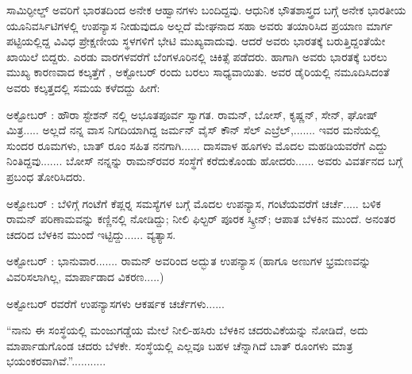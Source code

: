 ಸಾಮಿರ್‍ಫೀಲ್ಡ್ ಅವರಿಗೆ ಭಾರತದಿಂದ ಅನೇಕ ಆಹ್ವಾನಗಳು ಬಂದಿದ್ದವು. ಆಧುನಿಕ ಭೌತಶಾಸ್ತ್ರದ ಬಗ್ಗೆ ಅನೇಕ ಭಾರತೀಯ ಯೂನಿವರ್ಸಿಟಿಗಳಲ್ಲಿ ಉಪನ್ಯಾಸ ನೀಡುವುದೂ ಅಲ್ಲದೆ ಮೇಘನಾದ ಸಹಾ ಅವರು ತಯಾರಿಸಿದ ಪ್ರಯಾಣ ಮಾರ್ಗ ಪಟ್ಟಿಯಲ್ಲಿದ್ದ ವಿವಿಧ ಪ್ರೇಕ್ಷಣೀಯ ಸ್ಥಳಗಳಿಗೆ ಭೇಟಿ ಮುಖ್ಯವಾದುವು. ಆದರೆ ಅವರು ಭಾರತಕ್ಕೆ ಬರುತ್ತಿದ್ದಂತೆಯೇ ಖಾಯಿಲೆ ಬಿದ್ದರು. ಎರಡು ವಾರಗಳವರೆಗೆ ಬೆಂಗಳೂರಿನಲ್ಲಿ ಚಿಕಿತ್ಸೆ ಪಡೆದರು. ಹಾಗಾಗಿ ಅವರು ಭಾರತಕ್ಕೆ ಬರಲು ಮುಖ್ಯ ಕಾರಣವಾದ ಕಲ್ಕತ್ತೆಗೆ , ಅಕ್ಟೋಬರ್ ರಂದು ಬರಲು ಸಾಧ್ಯವಾಯಿತು. ಅವರ ಡೈರಿಯಲ್ಲಿ ನಮೂದಿಸಿದಂತೆ ಅವರು ಕಲ್ಕತ್ತದಲ್ಲಿ ಸಮಯ ಕಳೆದದ್ದು ಹೀಗೆ:

ಅಕ್ಟೋಬರ್ : ಹೌರಾ ಸ್ಟೇಶನ್ ನಲ್ಲಿ ಅಭೂತಪೂರ್ವ ಸ್ವಾಗತ. ರಾಮನ್, ಬೋಸ್, ಕೃಷ್ಣನ್, ಸೇನ್, ಘೋಷ್ ಮಿತ್ರ..... ಅಲ್ಲದೆ ನನ್ನ ವಾಸ ನಿಗದಿಯಾಗಿದ್ದ ಜರ್ಮನ್ ವೈಸ್ ಕೌನ್ ಸೆಲ್ ಎಬ್ರೆಲ್,....... ಇವರ ಮನೆಯಲ್ಲಿ  ಸುಂದರ ರೂಮಗಳು, ಬಾತ್ ರೂಂ ಸಹಿತ ನನಗಾಗಿ...... ದಾಸವಾಳ ಹೂಗಳು ಮೊದಲ ಮಹಡಿಯವರೆಗೆ ಎದ್ದು ನಿಂತಿದ್ದವು....... ಬೋಸ್ ನನ್ನನ್ನು ರಾಮನ್‍ರವರ ಸಂಸ್ಥೆಗೆ ಕರೆದುಕೊಂಡು ಹೋದರು...... ಅವರು ವಿವರ್ತನದ ಬಗ್ಗೆ ಪ್ರಬಂಧ ತೋರಿಸಿದರು.

ಅಕ್ಟೋಬರ್ : ಬೆಳಿಗ್ಗೆ  ಗಂಟೆಗೆ ಕೆಪ್ಲರ್‍ನ ಸಮಸ್ಯೆಗಳ ಬಗ್ಗೆ ಮೊದಲ ಉಪನ್ಯಾಸ,  ಗಂಟೆಯವರೆಗೆ ಚರ್ಚೆ..... ಬಳಿಕ ರಾಮನ್ ಪರಿಣಾಮವನ್ನು ಕಣ್ಣಿನಲ್ಲಿ ನೋಡಿದ್ದು; ನೀಲಿ ಫಿಲ್ಟರ್ ಪೂರಕ ಸ್ಕ್ರೀನ್; ಆಪಾತ ಬೆಳಕಿನ ಮುಂದೆ. ಅನಂತರ ಚದರಿದ ಬೆಳಕಿನ ಮುಂದೆ ಇಟ್ಟಿದ್ದು...... ವ್ಯತ್ಯಾಸ.

ಅಕ್ಟೋಬರ್ : ಭಾನುವಾರ....... ರಾಮನ್ ಅವರಿಂದ ಅದ್ಭುತ ಉಪನ್ಯಾಸ (ಹಾಗೂ ಅಣುಗಳ ಭ್ರಮಣವನ್ನು ವಿವರಿಸಲಾಗಿಲ್ಲ, ಮಾರ್ಪಾಡಾದ ವಿಕರಣ.....) 

ಅಕ್ಟೋಬರ್  ರವರೆಗೆ ಉಪನ್ಯಾಸಗಳು ಆಕರ್ಷಕ ಚರ್ಚೆಗಳು...... 

“ನಾನು ಈ ಸಂಸ್ಥೆಯಲ್ಲಿ ಮಂಜುಗಡ್ಡೆಯ ಮೇಲೆ ನೀಲಿ-ಹಸಿರು ಬೆಳಕಿನ ಚದರುವಿಕೆಯನ್ನು ನೋಡಿದೆ, ಅದು ಮಾರ್ಪಾಡುಗೊಂಡ ಚದರು ಬೆಳಕೇ. ಸಂಸ್ಥೆಯಲ್ಲಿ ಎಲ್ಲವೂ ಬಹಳ ಚೆನ್ನಾಗಿದೆ ಬಾತ್ ರೂಂಗಳು ಮಾತ್ರ ಭಯಂಕರವಾಗಿವೆ.”...........


